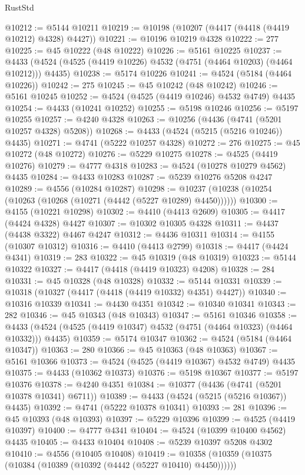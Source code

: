 \begin{lexlean}{RustStd}
\begin{coremodule}
@10212 := @5144 @10211
@10219 := @10198 (@10207 (@4417 (@4418 (@4419 @10212) @4328) @4427))
@10221 := @10196 @10219 @4328
@10222 := 277
@10225 := @45 @10222 (@48 @10222)
@10226 := @5161 @10225
@10237 := @4433 (@4524 (@4525 (@4419 @10226) @4532 (@4751 (@4464 @10203) (@4464 @10212))) @4435)
@10238 := @5174 @10226
@10241 := @4524 (@5184 (@4464 @10226))
@10242 := 275
@10245 := @45 @10242 (@48 @10242)
@10246 := @5161 @10245
@10252 := @4524 (@4525 (@4419 @10246) @4532 @4749) @4435
@10254 := @4433 (@10241 @10252)
@10255 := @5198 @10246
@10256 := @5197 @10255
@10257 := @4240 @4328
@10263 := @10256 (@4436 (@4741 (@5201 @10257 @4328) @5208))
@10268 := @4433 (@4524 (@5215 (@5216 @10246)) @4435)
@10271 := @4741 (@5222 @10257 @4328)
@10272 := 276
@10275 := @45 @10272 (@48 @10272)
@10276 := @5229 @10275
@10278 := @4525 (@4419 @10276)
@10279 := @4777 @4318
@10283 := @4524 (@10278 @10279 @4562) @4435
@10284 := @4433 @10283
@10287 := @5239 @10276 @5208 @4247
@10289 := @4556 (@10284 @10287)
@10298 := @10237 (@10238 (@10254 (@10263 (@10268 (@10271 (@4442 (@5227 @10289) @4450))))))
@10300 := @4155 (@10221 @10298)
@10302 := @4410 (@4413 @2609)
@10305 := @4417 (@4424 @4328) @4427
@10307 := @10302 @10305 @4328
@10311 := @4437 (@4438 @3322) @4467 @4247
@10312 := @4436 @10311
@10314 := @4155 (@10307 @10312)
@10316 := @4410 (@4413 @2799)
@10318 := @4417 (@4424 @4341)
@10319 := 283
@10322 := @45 @10319 (@48 @10319)
@10323 := @5144 @10322
@10327 := @4417 (@4418 (@4419 @10323) @4208)
@10328 := 284
@10331 := @45 @10328 (@48 @10328)
@10332 := @5144 @10331
@10339 := @10318 (@10327 (@4417 (@4418 (@4419 @10332) @4351) @4427))
@10340 := @10316 @10339
@10341 := @4430 @4351
@10342 := @10340 @10341
@10343 := 282
@10346 := @45 @10343 (@48 @10343)
@10347 := @5161 @10346
@10358 := @4433 (@4524 (@4525 (@4419 @10347) @4532 (@4751 (@4464 @10323) (@4464 @10332))) @4435)
@10359 := @5174 @10347
@10362 := @4524 (@5184 (@4464 @10347))
@10363 := 280
@10366 := @45 @10363 (@48 @10363)
@10367 := @5161 @10366
@10373 := @4524 (@4525 (@4419 @10367) @4532 @4749) @4435
@10375 := @4433 (@10362 @10373)
@10376 := @5198 @10367
@10377 := @5197 @10376
@10378 := @4240 @4351
@10384 := @10377 (@4436 (@4741 (@5201 @10378 @10341) @6711))
@10389 := @4433 (@4524 (@5215 (@5216 @10367)) @4435)
@10392 := @4741 (@5222 @10378 @10341)
@10393 := 281
@10396 := @45 @10393 (@48 @10393)
@10397 := @5229 @10396
@10399 := @4525 (@4419 @10397)
@10400 := @4777 @4341
@10404 := @4524 (@10399 @10400 @4562) @4435
@10405 := @4433 @10404
@10408 := @5239 @10397 @5208 @4302
@10410 := @4556 (@10405 @10408)
@10419 := @10358 (@10359 (@10375 (@10384 (@10389 (@10392 (@4442 (@5227 @10410) @4450))))))

\end{coremodule}
\end{lexlean}
